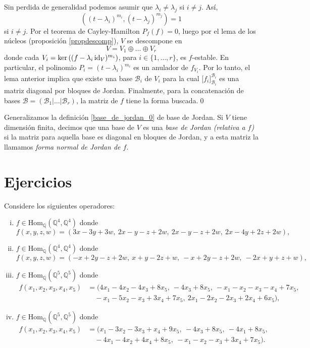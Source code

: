 \dem Sin perdida de generalidad podemos asumir que $\lambda_i\ne\lambda_j$ si $i\ne j$. As\'i,
\[
\left( (t-\lambda_i)^{m_i},(t-\lambda_j)^{m_j}\right)=1
\]
si $i\ne j$. Por el teorema de Cayley-Hamilton $P_f(f)=0$, luego por el lema de los núcleos (proposición \ref{propdescomp}), $V$ se descompone en
\[
V=V_1\oplus \ldots \oplus V_r
\]
donde cada $V_i=\ker\left((f-\lambda_i\operatorname{id}_V)^{m_i}\right)$, para $i\in\{1,\ldots,r\}$, es $f$-estable. En particular, el polinomio $P_i=(t-\lambda_i)^{m_i}$ es un anulador de $f_{V_i}$. Por lo tanto, el lema anterior implica que existe una base $\mathcal{B}_i$ de $V_i$ para la cual $\Big[f_i\Big]^{\mathcal{B}_i}_{\mathcal{B}_i}$ es una matriz diagonal por bloques de Jordan. Finalmente, para la concatenación de bases $\mathcal{B}=(\mathcal{B}_1|\ldots|\mathcal{B}_r)$, la matriz de $f$ tiene la forma buscada.\qed

\begin{defn}\label{base_de_jordan}
Generalizamos la definici\'on \ref{base_de_jordan_0} de base de Jordan. Si $V$ tiene dimensi\'on finita, decimos que una base de $V$ es una \emph{base de Jordan (relativa a $f$)} si la matriz para aquella base es diagonal en bloques de Jordan, y a esta matriz la llamamos \emph{forma normal de Jordan de $f$}.
\end{defn}

\section*{Ejercicios}\label{forma_de_jordan_ejercicios}

Considere los siguientes operadores:
\begin{enumerate}[(i)]
\item $f\in\textrm{Hom}_{\mathbb{Q}}(\mathbb{Q}^4,\mathbb{Q}^4)$ donde
$$f(x,y,z,w)=(3x-3y+3w,\ 2x-y-z+2w,\ 2x-y-z+2w,\ 2x-4y+2z+2w),$$
\item $f\in\textrm{Hom}_{\mathbb{Q}}(\mathbb{Q}^4,\mathbb{Q}^4)$ donde
$$f(x,y,z,w)=(-x+2y-z+2w,\ x+y-2z+w,\ -x+2y-z+2w,\ -2x+y+z+w),$$
\item $f\in\textrm{Hom}_{\mathbb{Q}}(\mathbb{Q}^5,\mathbb{Q}^5)$ donde
\begin{align*}
f(x_1,x_2,x_3,x_4,x_5) & =(4x_1-4x_2-4x_3+8x_5,\ -4x_3+8x_5,\ -x_1-x_2-x_3-x_4+7x_5,\\
 &\quad -x_1-5x_2-x_3+3x_4+7x_5,\ 2x_1-2x_2-2x_3+2x_4+6x_5),
\end{align*}
\item $f\in\textrm{Hom}_{\mathbb{Q}}(\mathbb{Q}^5,\mathbb{Q}^5)$ donde
\begin{align*}
f(x_1,x_2,x_3,x_4,x_5) & =(x_1-3x_2-3x_3+x_4+9x_5,\ -4x_3+8x_5,\ -4x_1+8x_5,\\
 &\quad -4x_1-4x_2+4x_4+8x_5,\ -x_1-x_2-x_3+3x_4+7x_5).
\end{align*}
\end{enumerate}

